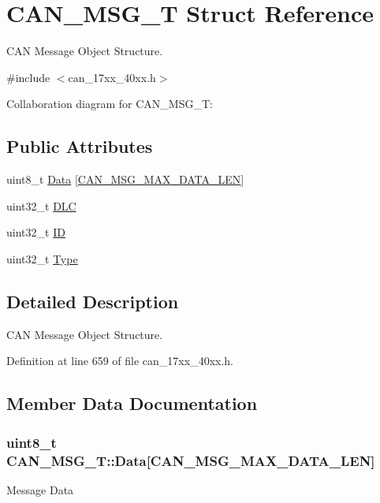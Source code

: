 \hypertarget{structCAN__MSG__T}{}\section{C\+A\+N\+\_\+\+M\+S\+G\+\_\+T Struct Reference}
\label{structCAN__MSG__T}


C\+AN Message Object Structure.  




{\ttfamily \#include $<$can\+\_\+17xx\+\_\+40xx.\+h$>$}



Collaboration diagram for C\+A\+N\+\_\+\+M\+S\+G\+\_\+T\+:
\subsection*{Public Attributes}
\begin{DoxyCompactItemize}
\item 
uint8\+\_\+t \hyperlink{structCAN__MSG__T_adb227f0afb0c340bdc92b4098c2734de}{Data} \mbox{[}\hyperlink{group__CAN__17XX__40XX_gafef54df2cd501083697e84c64614ffca}{C\+A\+N\+\_\+\+M\+S\+G\+\_\+\+M\+A\+X\+\_\+\+D\+A\+T\+A\+\_\+\+L\+EN}\mbox{]}
\item 
uint32\+\_\+t \hyperlink{structCAN__MSG__T_a39963b19d3cb9885a5e984a6805f2674}{D\+LC}
\item 
uint32\+\_\+t \hyperlink{structCAN__MSG__T_a7fbb2453bed19c5b143fb7336a697622}{ID}
\item 
uint32\+\_\+t \hyperlink{structCAN__MSG__T_a2c15ca6deba6d985f7d8d24caec2fb3b}{Type}
\end{DoxyCompactItemize}


\subsection{Detailed Description}
C\+AN Message Object Structure. 

Definition at line 659 of file can\+\_\+17xx\+\_\+40xx.\+h.



\subsection{Member Data Documentation}
\subsubsection[{\texorpdfstring{Data}{Data}}]{\setlength{\rightskip}{0pt plus 5cm}uint8\+\_\+t C\+A\+N\+\_\+\+M\+S\+G\+\_\+\+T\+::\+Data\mbox{[}{\bf C\+A\+N\+\_\+\+M\+S\+G\+\_\+\+M\+A\+X\+\_\+\+D\+A\+T\+A\+\_\+\+L\+EN}\mbox{]}}\hypertarget{structCAN__MSG__T_adb227f0afb0c340bdc92b4098c2734de}{}\label{structCAN__MSG__T_adb227f0afb0c340bdc92b4098c2734de}
Message Data 

